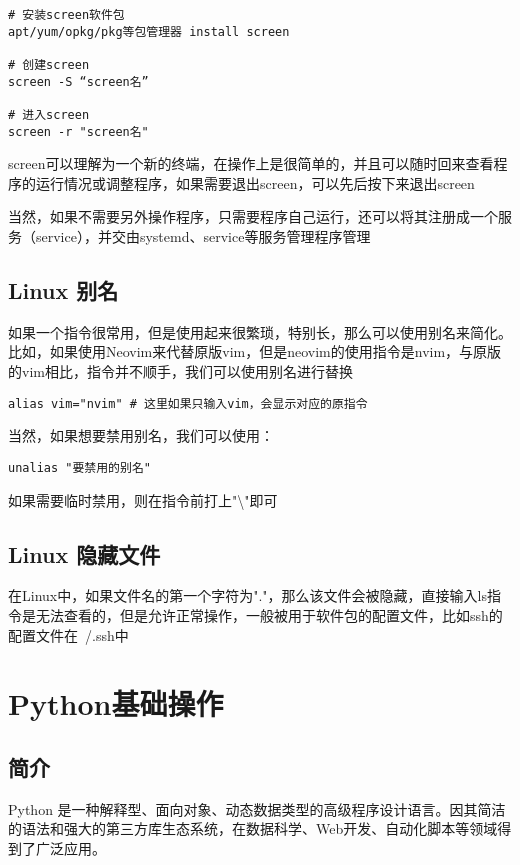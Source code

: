 \documentclass[UTF8]{gyh}
\begin{document}
\begin{lstlisting}
# 安装screen软件包
apt/yum/opkg/pkg等包管理器 install screen

# 创建screen
screen -S “screen名”

# 进入screen
screen -r "screen名"
\end{lstlisting}

screen可以理解为一个新的终端，在操作上是很简单的，并且可以随时回来查看程序的运行情况或调整程序，如果需要退出screen，可以先后按下来退出screen

当然，如果不需要另外操作程序，只需要程序自己运行，还可以将其注册成一个服务（service），并交由systemd、service等服务管理程序管理

\subsection{Linux 别名}

如果一个指令很常用，但是使用起来很繁琐，特别长，那么可以使用别名来简化。比如，如果使用Neovim来代替原版vim，但是neovim的使用指令是nvim，与原版的vim相比，指令并不顺手，我们可以使用别名进行替换

\begin{lstlisting}
alias vim="nvim" # 这里如果只输入vim，会显示对应的原指令
\end{lstlisting}

当然，如果想要禁用别名，我们可以使用：

\begin{lstlisting}
unalias "要禁用的别名"
\end{lstlisting}

如果需要临时禁用，则在指令前打上"\textbackslash"即可

\subsection{Linux 隐藏文件}

在Linux中，如果文件名的第一个字符为"."，那么该文件会被隐藏，直接输入ls指令是无法查看的，但是允许正常操作，一般被用于软件包的配置文件，比如ssh的配置文件在~/.ssh中


\section{Python基础操作}

\subsection{简介}
Python 是一种解释型、面向对象、动态数据类型的高级程序设计语言。因其简洁的语法和强大的第三方库生态系统，在数据科学、Web开发、自动化脚本等领域得到了广泛应用。
\end{document}
